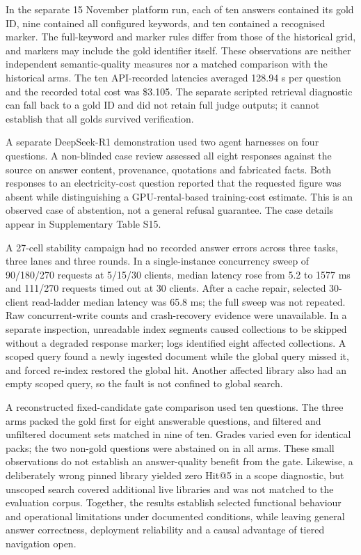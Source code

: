 In the separate 15 November platform run, each of ten answers contained its
gold ID, nine contained all configured keywords, and ten contained a
recognised marker. The full-keyword and marker rules differ from those of the
historical grid, and markers may include the gold identifier itself. These
observations are neither independent semantic-quality measures nor a matched
comparison with the historical arms. The ten API-recorded latencies averaged
128.94 s per question and the recorded total cost was \$3.105. The separate
scripted retrieval diagnostic can fall back to a gold ID and did not retain
full judge outputs; it cannot establish that all golds survived verification.

A separate DeepSeek-R1 demonstration used two agent harnesses on four
questions. A non-blinded case review assessed all eight responses against the
source on answer content, provenance, quotations and fabricated facts. Both
responses to an electricity-cost question reported that the requested figure
was absent while distinguishing a GPU-rental-based training-cost estimate.
This is an observed case of abstention, not a general refusal guarantee.
The case details appear in Supplementary Table S15.

A 27-cell stability campaign had no recorded answer errors across three tasks,
three lanes and three rounds. In a single-instance concurrency sweep of
90/180/270 requests at 5/15/30 clients, median latency rose from 5.2 to
1577 ms and 111/270 requests timed out at 30 clients. After a cache repair,
selected 30-client read-ladder median latency was 65.8 ms; the full sweep was
not repeated. Raw concurrent-write counts and crash-recovery evidence were
unavailable. In a separate inspection, unreadable index segments caused
collections to be skipped without a degraded response marker; logs identified
eight affected collections. A scoped query found a newly ingested document
while the global query missed it, and forced re-index restored the global hit.
Another affected library also had an empty scoped query, so the fault is not
confined to global search.

A reconstructed fixed-candidate gate comparison used ten questions. The three
arms packed the gold first for eight answerable questions, and filtered and
unfiltered document sets matched in nine of ten. Grades varied even for
identical packs; the two non-gold questions were abstained on in all arms.
These small observations do not establish an answer-quality benefit from the
gate. Likewise, a deliberately wrong pinned library yielded zero Hit@5 in a
scope diagnostic, but unscoped search covered additional live libraries and
was not matched to the evaluation corpus. Together, the results establish
selected functional behaviour and operational limitations under documented
conditions, while leaving general answer correctness, deployment reliability
and a causal advantage of tiered navigation open.
